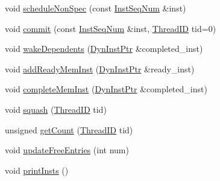 \begin{DoxyCompactItemize}
\item 
void \hyperlink{classInstQueue_a15ca5aaeab5bd4c2169ed41bbc7fb79c}{scheduleNonSpec} (const \hyperlink{inst__seq_8hh_a258d93d98edaedee089435c19ea2ea2e}{InstSeqNum} \&inst)
\item 
void \hyperlink{classInstQueue_a04f8d2acf3cd0b90a1efc69b528f91bc}{commit} (const \hyperlink{inst__seq_8hh_a258d93d98edaedee089435c19ea2ea2e}{InstSeqNum} \&inst, \hyperlink{base_2types_8hh_ab39b1a4f9dad884694c7a74ed69e6a6b}{ThreadID} tid=0)
\item 
void \hyperlink{classInstQueue_ab9afe94d332a563b9485d1bb9acd68b4}{wakeDependents} (\hyperlink{classInstQueue_a028ce10889c5f6450239d9e9a7347976}{DynInstPtr} \&completed\_\-inst)
\item 
void \hyperlink{classInstQueue_a76bcc078140b3e79923f7b5be8b302fb}{addReadyMemInst} (\hyperlink{classInstQueue_a028ce10889c5f6450239d9e9a7347976}{DynInstPtr} \&ready\_\-inst)
\item 
void \hyperlink{classInstQueue_aad2715729f71f220e9cf9b99515384ca}{completeMemInst} (\hyperlink{classInstQueue_a028ce10889c5f6450239d9e9a7347976}{DynInstPtr} \&completed\_\-inst)
\item 
void \hyperlink{classInstQueue_ad33d65c18c323d90695d7c2355b49af9}{squash} (\hyperlink{base_2types_8hh_ab39b1a4f9dad884694c7a74ed69e6a6b}{ThreadID} tid)
\item 
unsigned \hyperlink{classInstQueue_aaf7eb96b7ab2a8240d043b7d82494d15}{getCount} (\hyperlink{base_2types_8hh_ab39b1a4f9dad884694c7a74ed69e6a6b}{ThreadID} tid)
\item 
void \hyperlink{classInstQueue_a358bf0d85e8cd8b606877b341c518b5e}{updateFreeEntries} (int num)
\item 
void \hyperlink{classInstQueue_afc9c0c90c27fe0dc8bd4da915596bc21}{printInsts} ()
\end{DoxyCompactItemize}
